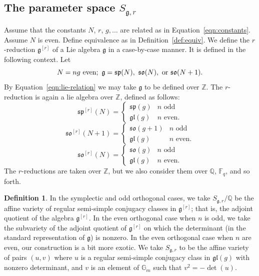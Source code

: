\documentclass[11pt]{amsart}
\theoremstyle{definition}
\newtheorem{definition}[theorem]{Definition}
\theoremstyle{remark}
\numberwithin{equation}{theorem}
\def\f{{\mathbb{F}_q}}
\newcommand{\ring}[1]{\mathbb{#1}}
\def\lie#1{{\mathfrak{#1}}}
\begin{document}
\subsection{The parameter space $S_{\lie{g},r}$} \label{sec:parameter-space}

Assume that the constants $N$, $r$, $g,\ldots$ are related as in
Equation~\ref{eqn:constants}.  Assume $N$ is even.  Define
equivalence as in Definition~\ref{def:equiv}.  We define the
$r$-reduction $\lie{g}^{[r]}$ of a Lie algebra $\lie{g}$ in a
case-by-case manner.  It is defined in the following context. Let
\begin{equation}
  N = n g \text{ even};\ \lie{g} = \lie{sp}(N),\ \lie{so}(N),
\hbox{ or } \lie{so}(N+1).
\end{equation}
By Equation~\ref{eqn:lie-relation} we may take $\lie{g}$ to be
defined over $\ring{Z}$.  The $r$-reduction is again a lie algebra
over $\ring{Z}$, defined as follows:
\begin{equation}
\lie{sp}^{[r]}(N) = \begin{cases}
                \lie{sp}(g) & n \text{ odd}\\
                \lie{gl}(g) & n \text{ even}.
                \end{cases}
\end{equation}
\begin{equation}\lie{so}^{[r]}(N+1) = \begin{cases}
                \lie{so}(g+1) & n \text{ odd}\\
                \lie{gl}(g) & n \text{ even}.
                \end{cases}
\end{equation}
\begin{equation}\lie{so}^{[r]}(N) = \begin{cases}
                \lie{so}(g) & n \text{ odd}\\
                \lie{gl}(g) & n \text{ even}.
                \end{cases}
\end{equation}
The $r$-reductions are taken over $\ring{Z}$, but we also consider
them over $\ring{Q}$, $\f$, and so forth.

\begin{definition}
In the symplectic and odd orthogonal cases, we take
$S_{\lie{g},r}/\ring{Q}$ be the affine variety of regular
semi-simple conjugacy classes in $\lie{g}^{[r]}$; that is, the
adjoint quotient of the algebra $\lie{g}^{[r]}$.   In the even
orthogonal case when $n$ is odd, we take the subvariety of the
adjoint quotient of $\lie{g}^{[r]}$ on which the determinant (in
the standard representation of $\lie{g}$) is nonzero.  In the even
orthogonal case when $n$ are even, our construction is a bit more
exotic.  We take $S_{\lie{g},r}$ to be the affine variety of pairs
$(u,v)$ where $u$ is a regular semi-simple conjugacy class in
$\lie{gl}(g)$ with nonzero determinant, and $v$ is an element of
$\ring{G}_m$ such that $v^2 = -\det(u)$.
\end{definition}
\end{document}
